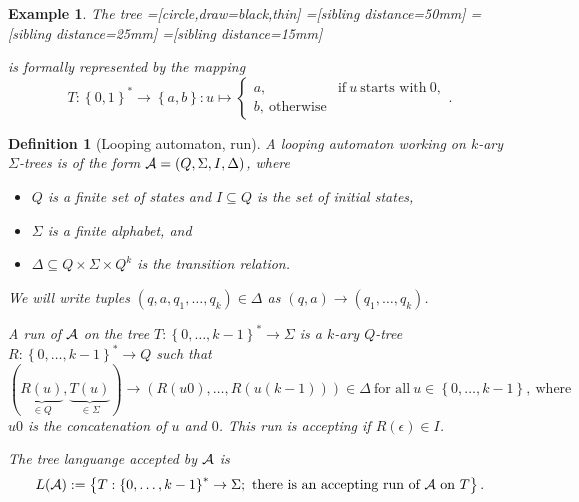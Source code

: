 \documentclass[openany]{scrbook}
\theoremstyle{break}
\newtheorem{Definition}[Theorem]{Definition}
\newtheorem{NumberedExample}[Theorem]{Example}
\theoremstyle{nonumberbreak}
\theoremstyle{nonumberplain}
\theoremstyle{nonumberbreak}
\newcommand{\set}[1]{\left\{#1\right\}}
\begin{document}
\begin{NumberedExample}
  \label{5.2}
  The tree
  =[circle,draw=black,thin]
  =[sibling distance=50mm]
  =[sibling distance=25mm]
  =[sibling distance=15mm]
    is formally represented by the mapping
    \begin{equation*}
      T: \set{0, 1}^* \to \set{a,
        b}: u \mapsto \begin{cases} a, & \text{if}\ u\ \text{starts
          with}\ 0, \\ b,\ \text{otherwise} \end{cases}.
    \end{equation*}
\end{NumberedExample}

\begin{Definition}[Looping automaton, run]
  \label{5.3}
  A looping automaton working on $k$-ary $\Sigma$-trees is of the form
  ${\cal A} = (Q, \Sigma, I, \Delta)$, where
  \begin{itemize}
  \item $Q$ is a finite set of states and $I \subseteq Q$ is the set
    of initial states,
  \item $\Sigma$ is a finite alphabet, and
  \item $\Delta \subseteq Q \times \Sigma \times Q^k$ is the
    transition relation.
  \end{itemize}

  We will write tuples $(q, a, q_1, \dotsc, q_k) \in \Delta$ as $(q,
  a) \to (q_1, \dotsc, q_k)$.

  A run of ${\cal A}$ on the tree $T: \set{0, \dotsc, k - 1}^* \to
  \Sigma$ is a $k$-ary $Q$-tree $R: \set{0, \dotsc, k - 1}^* \to Q$
  such that
  \begin{equation*}
    \left(\underbrace{R(u)}_{\in Q}, \underbrace{T(u)}_{\in
        \Sigma}\right) \to \left(R(u0), \dotsc, R(u(k - 1))\right) \in
    \Delta\ \text{for all}\ u \in \set{0, \dotsc, k - 1},\ \text{where}
  \end{equation*}
  $u0$ is the concatenation of $u$ and $0$. This run is accepting if
  $R(\epsilon) \in I$.

  The tree languange accepted by ${\cal A}$ is
  \begin{equation*}
    L({\cal A}) := \set{T:
      \set{0, \dotsc, k - 1}^* \to \Sigma;\ \text{there is an accepting
        run of}\ {\cal A}\ \text{on}\ T}.
  \end{equation*}
\end{Definition}
\end{document}
